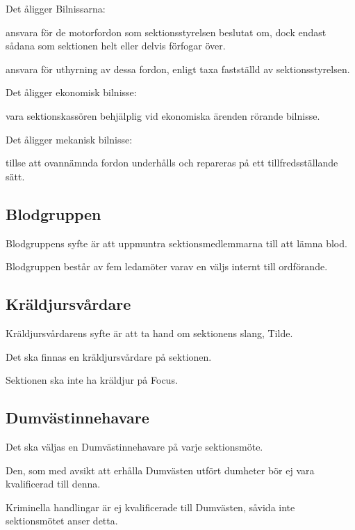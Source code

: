\documentclass{styrdokument}
\begin{document}
\? Det åligger Bilnissarna:
\begin{aligganden}
    \item ansvara för de motorfordon som sektionsstyrelsen beslutat om, dock endast sådana som sektionen helt eller delvis förfogar över.
    \item ansvara för uthyrning av dessa fordon, enligt taxa fastställd av sektionsstyrelsen.
\end{aligganden}

\? Det åligger ekonomisk bilnisse:
\begin{aligganden}
    \item vara sektionskassören behjälplig vid ekonomiska ärenden rörande bilnisse.
\end{aligganden}

\? Det åligger mekanisk bilnisse:
\begin{aligganden}
    \item tillse att ovannämnda fordon underhålls och repareras på ett tillfredsställande sätt.
\end{aligganden}

\subsection{Blodgruppen}
\? Blodgruppens syfte är att uppmuntra sektionsmedlemmarna till att lämna blod.

\? Blodgruppen består av fem ledamöter varav en väljs internt till ordförande.

\subsection{Kräldjursvårdare}
\? Kräldjursvårdarens syfte är att ta hand om sektionens slang, Tilde.

\? Det ska finnas en kräldjursvårdare på sektionen.

\? Sektionen ska inte ha kräldjur på Focus.

\subsection{Dumvästinnehavare}
\? Det ska väljas en Dumvästinnehavare på varje sektionsmöte.

\? Den, som med avsikt att erhålla Dumvästen utfört dumheter bör ej vara kvalificerad till denna.
		
\? Kriminella handlingar är ej kvalificerade till Dumvästen, såvida inte sektionsmötet anser detta.
		
\end{document}
